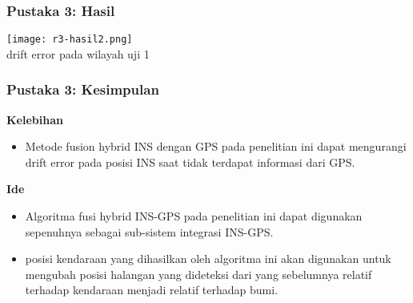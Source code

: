 \begin{frame}
    \frametitle{Pustaka 3: Hasil}
    \centering
    \texttt{[image: r3-hasil2.png]}\\
    drift error pada wilayah uji 1
\end{frame}


\begin{frame}
    \frametitle{Pustaka 3: Kesimpulan}

    \large
    \textbf{Kelebihan}\\
    \normalsize
    \begin{itemize}
        \item Metode fusion hybrid INS dengan GPS pada penelitian ini dapat mengurangi drift error pada posisi INS saat tidak terdapat informasi dari GPS.
    \end{itemize}

    \large
    \textbf{Ide}\\
    \normalsize
    \begin{itemize}
        \item Algoritma fusi hybrid INS-GPS pada penelitian ini dapat digunakan sepenuhnya sebagai sub-sistem integrasi INS-GPS.
        \item posisi kendaraan yang dihasilkan oleh algoritma ini akan digunakan untuk mengubah posisi halangan yang dideteksi dari yang sebelumnya relatif terhadap kendaraan menjadi relatif terhadap bumi.
    \end{itemize}

\end{frame}
